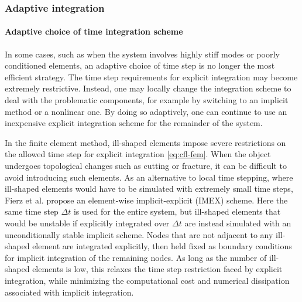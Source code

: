 \subsubsection{Adaptive integration}
\label{sec:adaptive-integration}

\paragraph*{Adaptive choice of time integration scheme}

In some cases, such as when the system involves highly stiff modes or poorly conditioned elements, an adaptive choice of time step is no longer the most efficient strategy.
The time step requirements for explicit integration may become extremely restrictive.
Instead, one may locally change the integration scheme to deal with the problematic components, for example by switching to an implicit method or a nonlinear one.
By doing so adaptively, one can continue to use an inexpensive explicit integration scheme for the remainder of the system.

In the finite element method, ill-shaped elements impose severe restrictions on the allowed time step for explicit integration \eqref{eq:cfl-fem}.
When the object undergoes topological changes such as cutting or fracture, it can be difficult to avoid introducing such elements.
As an alternative to local time stepping, where ill-shaped elements would have to be simulated with extremely small time steps, Fierz et al. \cite{Fierz2011} propose an element-wise implicit-explicit (IMEX) scheme.
Here the same time step $\Delta t$ is used for the entire system, but ill-shaped elements that would be unstable if explicitly integrated over $\Delta t$ are instead simulated with an unconditionally stable implicit scheme.
Nodes that are not adjacent to any ill-shaped element are integrated explicitly, then held fixed as boundary conditions for implicit integration of the remaining nodes.
As long as the number of ill-shaped elements is low, this relaxes the time step restriction faced by explicit integration, while minimizing the computational cost and numerical dissipation associated with implicit integration.



